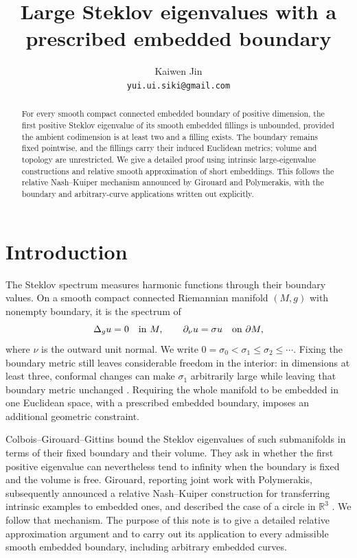\documentclass[11pt]{article}
\title{Large Steklov eigenvalues with a prescribed embedded boundary}
\author{Kaiwen Jin\\[2pt]\small\texttt{yui.ui.siki@gmail.com}}
\date{}
\theoremstyle{remark}
\newcommand{\R}{\mathbb R}
\begin{document}
\maketitle

\begin{abstract}
For every smooth compact connected embedded boundary of positive dimension,
the first positive Steklov eigenvalue of its smooth embedded fillings is
unbounded, provided the ambient codimension is at least two and a filling
exists. The boundary remains fixed pointwise, and the fillings carry their
induced Euclidean metrics; volume and topology are unrestricted. We give a
detailed proof using intrinsic large-eigenvalue constructions and relative
smooth approximation of short embeddings. This follows the relative
Nash--Kuiper mechanism announced by Girouard and Polymerakis, with the
boundary and arbitrary-curve applications written out explicitly.
\end{abstract}

\section{Introduction}\label{sec:introduction}

The Steklov spectrum measures harmonic functions through their boundary
values. On a smooth compact connected Riemannian manifold $(M,g)$ with
nonempty boundary, it is the spectrum of
\[
 \Delta_g u=0\quad\hbox{in }M,\qquad
 \partial_\nu u=\sigma u\quad\hbox{on }\partial M,
\]
where $\nu$ is the outward unit normal. We write
$0=\sigma_0<\sigma_1\leq\sigma_2\leq\cdots$.
Fixing the boundary metric still leaves considerable freedom in the
interior: in dimensions at least three, conformal changes can make
$\sigma_1$ arbitrarily large while leaving that boundary metric unchanged
\cite{CEG}. Requiring the whole manifold to be embedded in one Euclidean
space, with a prescribed embedded boundary, imposes an additional
geometric constraint.

Colbois--Girouard--Gittins \cite[Theorem~1.1]{CGG} bound the Steklov
eigenvalues of such submanifolds in terms of their fixed boundary and
their volume. They ask in \cite[Remark~1.7]{CGG} whether the first
positive eigenvalue can nevertheless tend to infinity when the boundary
is fixed and the volume is free. Girouard, reporting joint work with
Polymerakis, subsequently announced a relative Nash--Kuiper construction
for transferring intrinsic examples to embedded ones, and described the
case of a circle in $\R^3$ \cite[p.~2075]{GP}. We follow that mechanism.
The purpose of this note is to give a detailed relative approximation
argument and to carry out its application to every admissible smooth
embedded boundary, including arbitrary embedded curves.
\end{document}

